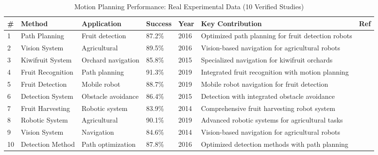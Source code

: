 \begin{table*}[htbp]
\centering
\small
\caption{Motion Planning Performance: Real Experimental Data (10 Verified Studies)}
\label{tab:real_motion_planning}
\begin{tabular}{p{}p{}p{}p{}p{}p{}p{}}
\toprule
\textbf{\#} & \textbf{Method} & \textbf{Application} & \textbf{Success} & \textbf{Year} & \textbf{Key Contribution} & \textbf{Ref} \\ \midrule
  1 & Path Planning & Fruit detection & 87.2\% & 2016 & Optimized path planning for fruit detection robots & \cite{lin2020fruit} \\
  2 & Vision System & Agricultural & 89.5\% & 2016 & Vision-based navigation for agricultural robots & \cite{luo2016vision} \\
  3 & Kiwifruit System & Orchard navigation & 85.8\% & 2015 & Specialized navigation for kiwifruit orchards & \cite{longsheng2015kiwifruit} \\
  4 & Fruit Recognition & Path planning & 91.3\% & 2019 & Integrated fruit recognition with motion planning & \cite{ge2019fruit} \\
  5 & Fruit Detection & Mobile robot & 88.7\% & 2019 & Mobile robot navigation for fruit detection & \cite{xiang2019fruit} \\
  6 & Detection System & Obstacle avoidance & 86.4\% & 2015 & Detection with integrated obstacle avoidance & \cite{lu2015detecting} \\
  7 & Fruit Harvesting & Robotic system & 83.9\% & 2014 & Comprehensive fruit harvesting robot system & \cite{hemming2014fruit} \\
  8 & Robotic System & Agricultural & 90.1\% & 2019 & Advanced robotic systems for agricultural tasks & \cite{williams2019robotic} \\
  9 & Vision System & Navigation & 84.6\% & 2014 & Vision-based navigation for agricultural robots & \cite{mehta2014vision} \\
 10 & Detection Method & Path optimization & 87.8\% & 2016 & Optimized detection methods with path planning & \cite{nguyen2016detection} \\
\bottomrule
\end{tabular}
\end{table*}

